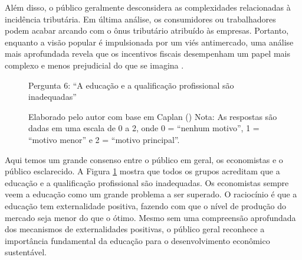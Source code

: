 Além disso, o público geralmente desconsidera as complexidades relacionadas à incidência tributária. Em última análise, os consumidores ou trabalhadores podem acabar arcando com o ônus tributário atribuído às empresas. Portanto, enquanto a visão popular é impulsionada por um viés antimercado, uma análise mais aprofundada revela que os incentivos fiscais desempenham um papel mais complexo e menos prejudicial do que se imagina \cite{The_Myth_of_the_Rational_Voter}.





\begin{figure}[H]
    \centering
    \caption*{Pergunta 6: “A educação e a qualificação profissional são inadequadas”}
    \caption{Elaborado pelo autor com base em Caplan (\citeyear{The_Myth_of_the_Rational_Voter}) \newline
    Nota: As respostas são dadas em uma escala de 0 a 2, onde 0 = “nenhum motivo”, 1 = “motivo menor” e 2 = “motivo principal”.}
    \label{fig:pergunta_6}
\end{figure}

Aqui temos um grande consenso entre o público em geral, os economistas e o público esclarecido. A Figura \ref{fig:pergunta_6} mostra que todos os grupos acreditam que a educação e a qualificação profissional são inadequadas. Os economistas sempre veem a educação como um grande problema a ser superado. O raciocínio é que a educação tem externalidade positiva, fazendo com que o nível de produção do mercado seja menor do que o ótimo. Mesmo sem uma compreensão aprofundada dos mecanismos de externalidades positivas, o público geral reconhece a importância fundamental da educação para o desenvolvimento econômico sustentável.







